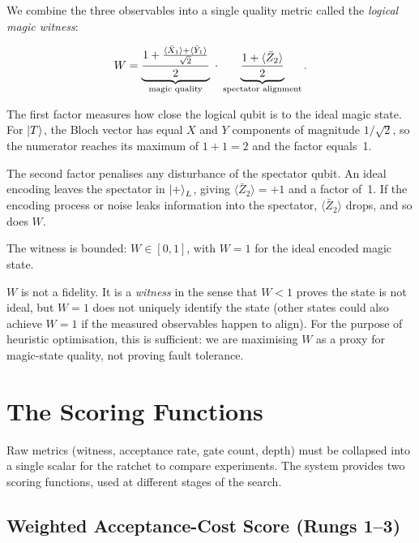 \documentclass[11pt,a4paper]{article}
\newcommand{\expect}[1]{\langle #1 \rangle}
\begin{document}
We combine the three observables into a single quality metric called the
\emph{logical magic witness}:

\begin{equation}
  W = \underbrace{%
    \frac{1 + \frac{\expect{\bar{X}_1} + \expect{\bar{Y}_1}}{\sqrt{2}}}{2}
  }_{\text{magic quality}} \;\cdot\;
  \underbrace{%
    \frac{1 + \expect{\bar{Z}_2}}{2}
  }_{\text{spectator alignment}}.
  \label{eq:witness}
\end{equation}

The first factor measures how close the logical qubit is to the ideal magic
state. For $\ket{T}$, the Bloch vector has equal $X$ and $Y$ components of
magnitude $1/\sqrt{2}$, so the numerator reaches its maximum of $1 + 1 = 2$
and the factor equals~1.

The second factor penalises any disturbance of the spectator qubit. An ideal
encoding leaves the spectator in $\ket{+}_L$, giving $\expect{\bar{Z}_2} =
+1$ and a factor of~1. If the encoding process or noise leaks information
into the spectator, $\expect{\bar{Z}_2}$ drops, and so does $W$.

The witness is bounded: $W \in [0, 1]$, with $W = 1$ for the ideal encoded
magic state.

\begin{warning}
$W$ is not a fidelity. It is a \emph{witness} in the sense that $W < 1$
proves the state is not ideal, but $W = 1$ does not uniquely identify the
state (other states could also achieve $W = 1$ if the measured observables
happen to align). For the purpose of heuristic optimisation, this is
sufficient: we are maximising $W$ as a proxy for magic-state quality, not
proving fault tolerance.
\end{warning}

\section{The Scoring Functions}
\label{sec:scoring}

Raw metrics (witness, acceptance rate, gate count, depth) must be collapsed
into a single scalar for the ratchet to compare experiments. The system
provides two scoring functions, used at different stages of the search.

\subsection{Weighted Acceptance-Cost Score (Rungs 1--3)}
\label{sec:wac}
\end{document}
